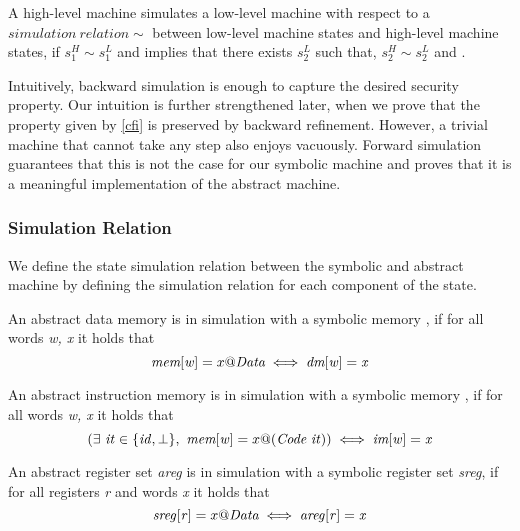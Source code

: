\begin{definition}
\label{fwd_simulation_LH}
  A high-level machine simulates a low-level machine with respect to a
  $simulation~relation \sim$ between low-level machine states and
  high-level machine states, if $s^H_1 \sim s_1^L$ and
   implies that there exists $s^L_2$ such that,
  $s^H_2 \sim s^L_2$ and .
\end{definition}

Intuitively, backward simulation is enough to capture the desired
security property. Our intuition is further strengthened later, when
we prove that the \CFI property given by \cref{cfi} is preserved by
backward refinement. However, a trivial machine that cannot take any step
also enjoys \CFI vacuously. Forward simulation guarantees that this is not
the case for our symbolic machine and proves that it is a meaningful
implementation of the abstract machine.

\subsubsection{Simulation Relation}
\label{sec:sim_relation}

We define the state simulation relation between the symbolic and
abstract machine by defining the simulation relation for each
component of the state.

\begin{definition}\label{refine_dmemory}
  An abstract data memory \dmem is in simulation with a
  symbolic memory \mem, if for all words \textit{w, x} it holds
  that
  $$\textit{mem}[\mathit{w}] = x@\textit{Data}
  \iff \textit{dm}[\mathit{w}] = \mathit{x}$$
\end{definition}

\begin{definition}
  \label{refine_imemory}
  An abstract instruction memory \imem is in simulation with a
  symbolic memory \mem, if for all words \textit{w, x} it holds
  that
  $$(\exists~\mathit{it \in \lbrace id,\bot\rbrace}, ~ \textit{mem}[\mathit{w}] =
  x@(\textit{Code}~\mathit{it}))
  \iff \textit{im}[\mathit{w}] = \mathit{x}$$
\end{definition}

\begin{definition}
  \label{refine_registers}
  An abstract register set \textit{areg} is in simulation with a
  symbolic register set \textit{sreg}, if for all registers \textit{r} and words
  \textit{x} it holds that
  $$ \mathit{sreg}[\mathit{r}] = x@\textit{Data}
  \iff \mathit{areg}[\mathit{r}] = \mathit{x}$$
\end{definition}

